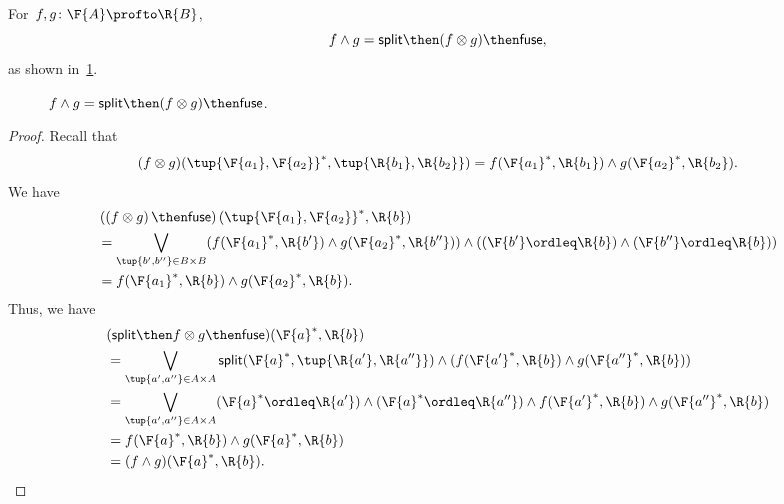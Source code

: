\begin{lemma}
	\label{lem:intersection_split}
	For~$f,g \colon \F{A} \profto \R{B}$,
	\begin{equation}
		f \wedge g = \mathsf{split} \then (f \otimes g) \then \mathsf{fuse},
	\end{equation}
	as shown in~\cref{fig:lemmasplitfuse}.
	\begin{figure}[h!]
		\begin{center}
		\end{center}
		\caption{$f \wedge g = \mathsf{split} \then (f \otimes g) \then \mathsf{fuse}$. }
		\label{fig:lemmasplitfuse}
	\end{figure}
\end{lemma}

\begin{proof}
	Recall that
	\begin{equation}
		(f\otimes g)(\tup{\F{a_1},\F{a_2}}^*,\tup{\R{b_1},\R{b_2}})
		=f(\F{a_1}^*,\R{b_1})\wedge g(\F{a_2}^*,\R{b_2}).
	\end{equation}
	We have
	\begin{equation}
		\begin{aligned}
			 & \left(\left(f\otimes g\right) \then \mathsf{fuse}\right)(\tup{\F{a_1},\F{a_2}}^*,\R{b})                                                          \\
			 & =\bigvee_{\tup{b',b''}\in B\times B}(f(\F{a_1}^*,\R{b'})\wedge g(\F{a_2}^*,\R{b''}))\wedge ((\F{b'}\ordleq \R{b}) \wedge (\F{b''}\ordleq \R{b})) \\
			 & =f(\F{a_1}^*,\R{b})\wedge g(\F{a_2}^*,\R{b}).
		\end{aligned}
	\end{equation}
	Thus, we have
	\begin{equation}
		\begin{aligned}
			 & (\mathsf{split}\then f\otimes g\then \mathsf{fuse})(\F{a}^*,\R{b})                                                                          \\&=\bigvee_{\tup{a',a''}\in A\times A} \mathsf{split}(\F{a}^*,\tup{\R{a'},\R{a''}})\wedge (f(\F{a'}^*,\R{b})\wedge g(\F{a''}^*,\R{b}))\\
			 & =\bigvee_{\tup{a',a''}\in A\times A}(\F{a}^*\ordleq \R{a'})\wedge (\F{a}^*\ordleq \R{a''})\wedge f(\F{a'}^*,\R{b})\wedge g(\F{a''}^*,\R{b}) \\
			 & =f(\F{a}^*,\R{b})\wedge g(\F{a}^*,\R{b})                                                                                                    \\
			 & =(f\wedge g)(\F{a}^*,\R{b}).
		\end{aligned}
	\end{equation}
\end{proof}

